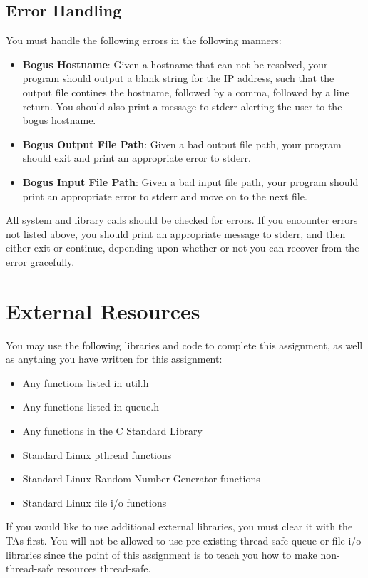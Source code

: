 \documentclass[12pt]{article}
\begin{document}
\subsection{Error Handling}
You must handle the following errors in the following manners:

\begin{itemize}
\item {\bf Bogus Hostname}: Given a hostname that can not be resolved,
  your program should output a blank string for the IP address, such
  that the output file contines the hostname, followed by a comma,
  followed by a line return. You should also print a message to stderr
  alerting the user to the bogus hostname.
\item {\bf Bogus Output File Path}: Given a bad output file path, your
  program should exit and print an appropriate error to stderr.
\item {\bf Bogus Input File Path}: Given a bad input file path, your
  program should print an appropriate error to stderr and move on to
  the next file.
\end{itemize}

All system and library calls should be checked for errors.
If you encounter
errors not listed above, you should print an appropriate message to
stderr, and then either exit or continue, depending upon whether or not
you can recover from the error gracefully.

\section{External Resources}
You may use the following libraries and code to complete this
assignment, as well as anything you have written for this assignment:

\begin{itemize}
  \item Any functions listed in util.h
  \item Any functions listed in queue.h
  \item Any functions in the C Standard Library
  \item Standard Linux pthread functions  
  \item Standard Linux Random Number Generator functions
  \item Standard Linux file i/o functions
\end{itemize}

If you would like to use additional external libraries, you must clear
it with the TAs first. You will not be allowed to use pre-existing
thread-safe queue or file i/o libraries since the point of this
assignment is to teach you how to make non-thread-safe resources
thread-safe.
\end{document}
